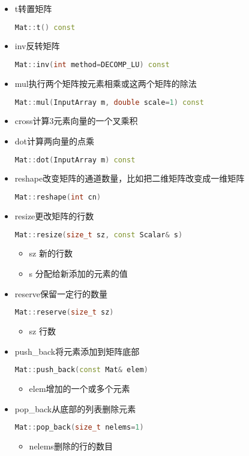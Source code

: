 \documentclass[12pt]{article}
\begin{document}
\begin{itemize}
\item t转置矩阵
	\begin{lstlisting}[language=c++]
	Mat::t() const
	\end{lstlisting}
\item inv反转矩阵
	\begin{lstlisting}[language=c++]
	Mat::inv(int method=DECOMP_LU) const
	\end{lstlisting}
\item mul执行两个矩阵按元素相乘或这两个矩阵的除法
	\begin{lstlisting}[language=c++]
	Mat::mul(InputArray m, double scale=1) const
	\end{lstlisting}
\item cross计算3元素向量的一个叉乘积
\item dot计算两向量的点乘
	\begin{lstlisting}[language=c++]
	Mat::dot(InputArray m) const
	\end{lstlisting}
\item reshape改变矩阵的通道数量，比如把二维矩阵改变成一维矩阵
	\begin{lstlisting}[language=c++]
	Mat::reshape(int cn)
	\end{lstlisting}
\item resize更改矩阵的行数
	\begin{lstlisting}[language=c++]
	Mat::resize(size_t sz, const Scalar& s)
	\end{lstlisting}
		\begin{itemize}
		\item sz \quad 新的行数
		\item s \quad 分配给新添加的元素的值
		\end{itemize}
\item reserve保留一定行的数量
	\begin{lstlisting}[language=c++]
	Mat::reserve(size_t sz)
	\end{lstlisting}
		\begin{itemize}
		\item sz \quad 行数
		\end{itemize}
\item push\_back将元素添加到矩阵底部
	\begin{lstlisting}[language=c++]
	Mat::push_back(const Mat& elem)
	\end{lstlisting}
		\begin{itemize}
		\item elem增加的一个或多个元素
		\end{itemize}
\item pop\_back从底部的列表删除元素
	\begin{lstlisting}[language=c++]
	Mat::pop_back(size_t nelems=1)
	\end{lstlisting}
		\begin{itemize}
		\item nelems删除的行的数目
		\end{itemize}
\end{itemize}
\end{document}
